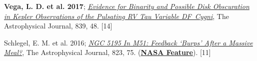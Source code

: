 \documentclass[letter,12pt]{article}
\begin{document}
\begin{etaremune}
\item {\bf Vega, L. D. et al. 2017}; \href{https://ui.adsabs.harvard.edu/abs/2017ApJ...839...48V/abstract}{{\it Evidence for Binarity and Possible Disk Obscuration in Kepler Observations of the Pulsating RV Tau Variable DF~Cygni}}, The Astrophysical Journal, 839, 48. [14]

\item Schlegel, E. M. et al. 2016; \href{https://ui.adsabs.harvard.edu/abs/2016ApJ...823...75S/abstract}{{\it NGC 5195 In M51: Feedback ‘Burps’ After a Massive Meal?}}, The Astrophysical Journal, 823, 75. (\href{https://www.nasa.gov/mission_pages/chandra/nasa-s-chandra-finds-supermassive-black-hole-burping-nearby.html}{\bf NASA Feature}). [11]

\end{etaremune}

\end{document}
